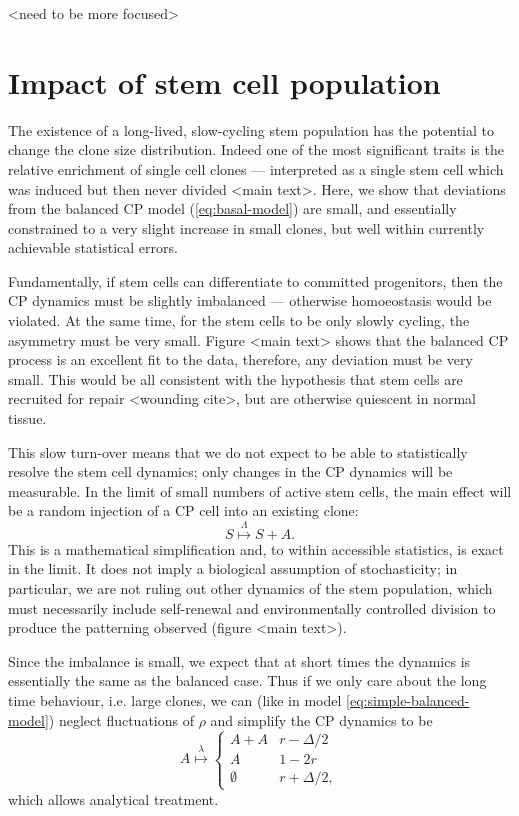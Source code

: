 \documentclass[10pt,UKenglish]{article}
\begin{document}
<need to be more focused>

\section{Impact of stem cell population}

The existence of a long-lived, slow-cycling stem population has the potential to change the clone size distribution. Indeed one of the most significant traits is the relative enrichment of single cell clones --- interpreted as a single stem cell which was induced but then never divided <main text>. Here, we show that deviations from the balanced CP model (\ref{eq:basal-model}) are small, and essentially constrained to a very slight increase in small clones, but well within currently achievable statistical errors.

Fundamentally, if stem cells can differentiate to committed progenitors, then the CP dynamics must be slightly imbalanced --- otherwise homoeostasis would be violated. At the same time, for the stem cells to be only slowly cycling, the asymmetry must be very small. Figure <main text> shows that the balanced CP process is an excellent fit to the data, therefore, any deviation must be very small. This would be all consistent with the hypothesis that stem cells are recruited for repair <wounding cite>, but are otherwise quiescent in normal tissue.

This slow turn-over means that we do not expect to be able to statistically resolve the stem cell dynamics; only changes in the CP dynamics will be measurable. In the limit of small numbers of active stem cells, the main effect will be a random injection of a CP cell into an existing clone: 
\begin{equation}
S \overset{\Lambda}{\longmapsto} S+A. \label{eq:stem-division-model}
\end{equation}
This is a mathematical simplification and, to within accessible statistics, is exact in the limit. It does not imply a biological assumption of stochasticity; in particular, we are not ruling out other dynamics of the stem population, which must necessarily include self-renewal and environmentally controlled division to produce the patterning observed (figure <main text>).

Since the imbalance is small, we expect that at short times the dynamics is essentially the same as the balanced case. Thus if we only care about the long time behaviour, i.e. large clones, we can (like in model \ref{eq:simple-balanced-model}) neglect fluctuations of $\rho$ and simplify the CP dynamics to be
\begin{equation}
A \overset{\lambda}{\longmapsto} \begin{cases}
A+A & r - \Delta/2 \\
A & 1 - 2r \\
\emptyset & r + \Delta/2,
\end{cases}\label{eq:subcritical-cp-model}
\end{equation} which allows analytical treatment.
\end{document}
